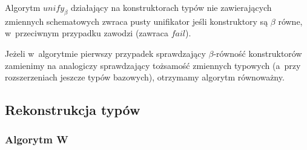 \documentclass[11pt,leqno]{article}
\begin{document}
\begin{fakt}
Algorytm $unify_\beta$ działający na konstruktorach typów nie zawierających zmiennych schematowych
zwraca pusty unifikator jeśli konstruktory są $\beta$ równe, w~przeciwnym przypadku zawodzi (zawraca $fail$).
\end{fakt}


\begin{fakt}
Jeżeli w~algorytmie pierwszy przypadek sprawdzający $\beta$-równość konstruktorów zamienimy na analogiczy 
sprawdzający tożsamość zmiennych typowych (a~przy rozszerzeniach jeszcze typów bazowych), otrzymamy algorytm
równoważny.
\end{fakt}


\subsection{Rekonstrukcja typów}

\subsubsection{Algorytm W}
\end{document}
